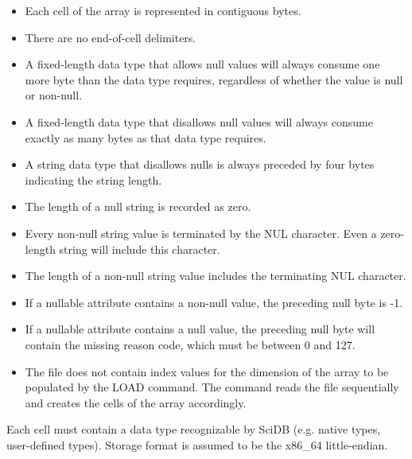 \begin{itemize}
\item Each cell of the array is represented in contiguous bytes.
\item There are no end-of-cell delimiters.
\item A fixed-length data type that allows null values will always consume one more byte than the data type requires, regardless of whether the value is null or non-null.
\item A fixed-length data type that disallows null values will always consume exactly as many bytes as that data type requires.
\item A string data type that disallows nulls is always preceded by four bytes indicating the string length.
\item The length of a null string is recorded as zero.
\item Every non-null string value is terminated by the NUL character. Even a zero-length string will include this character.
\item The length of a non-null string value includes the terminating NUL character.
\item If a nullable attribute contains a non-null value, the preceding null byte is -1.
\item If a nullable attribute contains a null value, the preceding null byte will contain the missing reason code, which must be between 0 and 127.
\item The file does not contain index values for the dimension of the array to be populated by the LOAD command. The command reads the file sequentially and creates the cells of the array accordingly.
\end{itemize}

Each cell must contain a data type recognizable by SciDB (e.g. native types, user-defined types). Storage format is assumed to be the x86\_64 little-endian.

